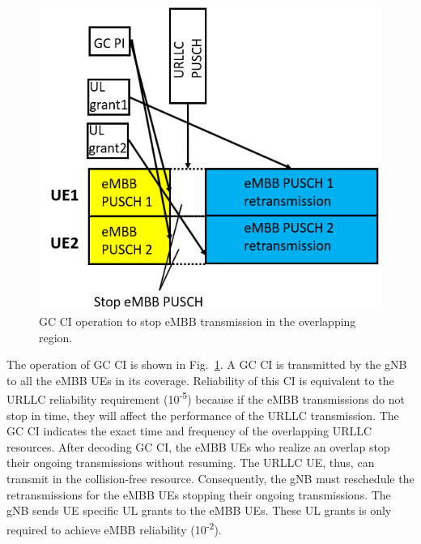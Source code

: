 \documentclass{ieeeaccess}
\begin{document}
\begin{figure}[htbp]
\centerline{\includegraphics[scale=0.38]{fig10.PNG}}
\caption{GC CI operation to stop eMBB transmission in the overlapping region.}
\label{fig10}
\vspace{-2mm}
\end{figure}

The operation of GC CI is shown in Fig.~\ref{fig10}. A GC CI is transmitted by the gNB to all the eMBB UEs in its coverage. Reliability of this CI is equivalent to the URLLC reliability requirement (10\textsuperscript{-5}) because if the eMBB transmissions do not stop in time, they will affect the performance of the URLLC transmission. The GC CI indicates the exact time and frequency of the overlapping URLLC resources. After decoding GC CI, the eMBB UEs who realize an overlap stop their ongoing transmissions without resuming. The URLLC UE, thus, can transmit in the collision-free resource. Consequently, the gNB must reschedule the retransmissions for the eMBB UEs stopping their ongoing transmissions. The gNB sends UE specific UL grants to the eMBB UEs. These UL grants is only required to achieve eMBB reliability (10\textsuperscript{-2}).
\end{document}
